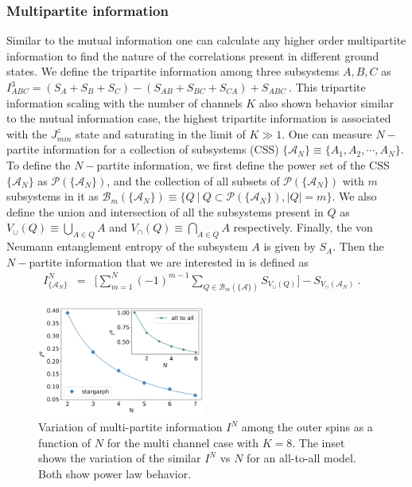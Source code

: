 \documentclass[reprint,prb,superscriptaddress]{revtex4-2}
\begin{document}
\subsubsection{Multipartite information}
\noindent Similar to the mutual information one can calculate any higher order multipartite information to find the nature of the correlations present in different ground states. We define the tripartite information among three subsystems $A,B,C$ as $I^3_{ABC} = (S_A+S_B+S_C)-(S_{AB}+S_{BC}+S_{CA})+S_{ABC}~$. This tripartite information scaling with the number of channels $K$ also shown behavior similar to the mutual information case, the highest tripartite information is associated with the $J^z_{min}$ state and saturating in the limit of $K\gg 1$. One can measure $N-$partite information for a collection of subsystems (CSS) $\{\mathcal{A}_N\}\equiv\{A_1,A_2,\cdots,A_N\}$. To define the $N-$partite information, we first define the power set of the CSS $\{\mathcal{A}_N\}$ as $\mathcal{P}(\{\mathcal{A}_{N}\})$, and the collection of all subsets of $\mathcal{P}(\{\mathcal{A}_{N}\})$ with $m$ subsystems in it as $\mathcal{B}_m(\{\mathcal{A}_N\})\equiv \{ Q~| ~Q\subset \mathcal{P}(\{\mathcal{A}_{N}\}), |Q|=m \}$. We also define the union and intersection of all the subsystems present in $Q$ as ${V}_{\cup}({Q})\equiv \bigcup_{A\in Q} A$ and ${V}_{\cap}({Q})\equiv \bigcap_{A\in Q} A$ respectively. Finally, the von Neumann entanglement entropy of the subsystem $A$ is given by $S_{A} $. Then the $N-$partite information that we are interested in is defined as
\begin{eqnarray}
I^{N}_{\{\mathcal{A}_N\}} &=& \bigg[\displaystyle\sum_{m=1}^{N} (-1)^{m-1} \displaystyle\sum_{Q \in \mathcal{B}_m(\{\mathcal{A}\})} S_{V_{\cup}({Q})} \bigg]- S_{V_{\cap}(\mathcal{A}_N)}~.~~~~
\label{eq:I_N_definition}
\end{eqnarray}
\begin{figure}
\includegraphics[width=0.49\textwidth]{plt/2022_IN_vs_N_K8.png}
\caption{Variation of multi-partite information $I^N$ among the outer spins as a function of $N$ for the multi channel case with $K=8$. The inset shows the variation of the similar $I^N$ vs $N$ for an all-to-all model. Both show power law behavior.}
\label{fig:Im_vs_m}
\end{figure}
\end{document}
